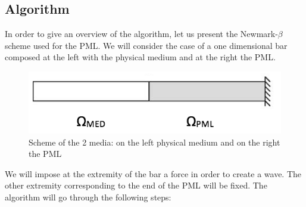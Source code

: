 \subsection{Algorithm}
In order to give an overview of the algorithm, let us present the Newmark-$\beta$ scheme used for the PML. We will consider the case of a one dimensional bar composed at the left with the physical medium and at the right the PML.
\begin{figure}[H]
    \centering
    \includegraphics{images/pml_scheme.png}
    \caption{Scheme of the 2 media: on the left physical medium  and on the right the PML}
    \label{fig:sch_pml}
\end{figure}
We will impose at the extremity of the bar a force in order to create a wave. The other extremity corresponding to the end of the PML will be fixed. The algorithm will go through the following steps: 
